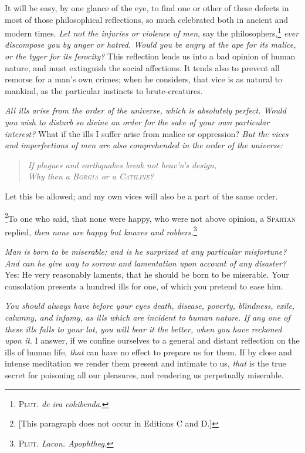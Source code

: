 It will be easy, by one glance of the eye, to find one or other of
these defects in most of those philosophical reflections, so much
celebrated both in ancient and modern times. \textit{Let not the
injuries or violence of men}, say the
philosophers,\footnote{\textsc{Plut}. \textit{de ira cohibenda}.}
\textit{ever discompose you by anger or hatred. Would you be angry at
the ape for its malice, or the tyger for its ferocity?} This
reflection leads us into a bad opinion of human nature, and must
extinguish the social affections. It tends also to prevent all remorse
for a man's own crimes; when he considers, that vice is as natural to
mankind, as the particular instincts to brute-creatures.

\textit{All ills arise from the order of the universe, which is
absolutely perfect. Would you wish to disturb so divine an order for
the sake of your own particular interest?} What if the ills I suffer
arise from malice or oppression? \textit{But the vices and 
imperfections of men are also comprehended in the order of the
universe:}

\begin{verse}
\textit{If plagues and earthquakes break not heav'n's design,\\
Why then a \textsc{Borgia} or a \textsc{Catiline}?}
\end{verse}

\noindent Let this be allowed; and my own vices will also be a part of
the same order.

\footnote{[This paragraph does not occur in Editions C and D.]}To one
who said, that none were happy, who were not above opinion, a
\textsc{Spartan} replied, \textit{then none are happy but knaves and
robbers}.\footnote{\textsc{Plut}. \textit{Lacon. Apophtheg}.}

\textit{Man is born to be miserable; and is he surprized at any
particular misfortune? And can he give way to sorrow and lamentation
upon account of any disaster?} Yes: He very reasonably laments, that
he should be born to be miserable. Your consolation presents a hundred
ills for one, of which you pretend to ease him.

\textit{You should always have before your eyes death, disease,
poverty, blindness, exile, calumny, and infamy, as ills which are
incident to human nature. If any one of these ills falls to your lot,
you will bear it the better, when you have reckoned upon it}. I
answer, if we confine ourselves to a general and distant reflection on
the ills of human life, \textit{that} can have no effect to prepare us
for them. If by close and intense meditation we render them present
and intimate to us, \textit{that} is the true secret for poisoning all
our pleasures, and rendering us perpetually miserable.

